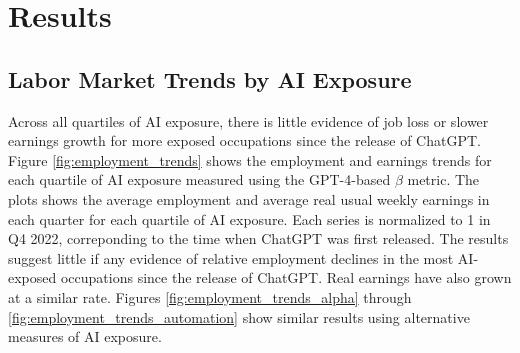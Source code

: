 \documentclass[12pt]{article}
\numberwithin{equation}{section}
\theoremstyle{theorem}\newcustomtheorem{theorem}{{\bf\sc Theorem}}
\theoremstyle{definition}\newcustomtheorem{assumption}{{\bf\sc Assumption}}
\theoremstyle{theorem} \newcustomtheorem{proposition}{{\bf\sc Proposition}}
\begin{document}
\section{Results}

\subsection{Labor Market Trends by AI Exposure}

Across all quartiles of AI exposure, there is little evidence of job loss or slower earnings growth for more exposed occupations since the release of ChatGPT. Figure \ref{fig:employment_trends} shows the employment and earnings trends for each quartile of AI exposure measured using the GPT-4-based $\beta$ metric. The plots shows the average employment and average real usual weekly earnings in each quarter for each quartile of AI exposure. Each series is normalized to 1 in Q4 2022, correponding to the time when ChatGPT was first released. The results suggest little if any evidence of relative employment declines in the most AI-exposed occupations since the release of ChatGPT. Real earnings have also grown at a similar rate. Figures \ref{fig:employment_trends_alpha} through \ref{fig:employment_trends_automation} show similar results using alternative measures of AI exposure. 
\end{document}
